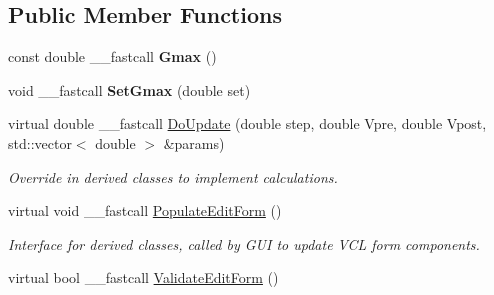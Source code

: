 \subsection*{Public Member Functions}
\begin{DoxyCompactItemize}
\item 
\hypertarget{class_t_gap_junction_current_a919aed5682ef44e406ddce156bd3ba8f}{const double \+\_\+\+\_\+fastcall {\bfseries Gmax} ()}\label{class_t_gap_junction_current_a919aed5682ef44e406ddce156bd3ba8f}

\item 
\hypertarget{class_t_gap_junction_current_a040d4dc75f830644d35ea750e3b62d9e}{void \+\_\+\+\_\+fastcall {\bfseries Set\+Gmax} (double set)}\label{class_t_gap_junction_current_a040d4dc75f830644d35ea750e3b62d9e}

\item 
virtual double \+\_\+\+\_\+fastcall \hyperlink{class_t_gap_junction_current_afe17510f53a732d0499ea704433d69a3}{Do\+Update} (double step, double Vpre, double Vpost, std\+::vector$<$ double $>$ \&params)
\begin{DoxyCompactList}\small\item\em Override in derived classes to implement calculations. \end{DoxyCompactList}\item 
\hypertarget{class_t_gap_junction_current_a27c5c0af154986ba413247df1eb1f8b1}{virtual void \+\_\+\+\_\+fastcall \hyperlink{class_t_gap_junction_current_a27c5c0af154986ba413247df1eb1f8b1}{Populate\+Edit\+Form} ()}\label{class_t_gap_junction_current_a27c5c0af154986ba413247df1eb1f8b1}

\begin{DoxyCompactList}\small\item\em Interface for derived classes, called by G\+U\+I to update V\+C\+L form components. \end{DoxyCompactList}\item 
\hypertarget{class_t_gap_junction_current_a5dba9768c2c9dcf91617cf906ef53bda}{virtual bool \+\_\+\+\_\+fastcall \hyperlink{class_t_gap_junction_current_a5dba9768c2c9dcf91617cf906ef53bda}{Validate\+Edit\+Form} ()}\label{class_t_gap_junction_current_a5dba9768c2c9dcf91617cf906ef53bda}


\end{DoxyCompactItemize}
